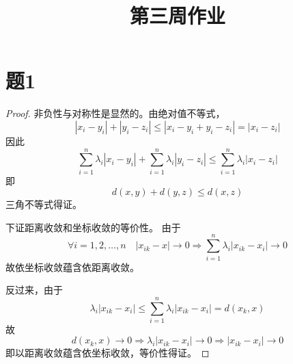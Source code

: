 \documentclass[cn]{homework}
\title{第三周作业}
\begin{document}
    \maketitle

    \section{题1}
    \begin{proof}
        非负性与对称性是显然的。由绝对值不等式，
        \[|x_i-y_i|+|y_i-z_i|\leq|x_i-y_i+y_i-z_i|=|x_i-z_i|\]
        因此
        \[\sum_{i=1}^n\lambda_i|x_i-y_i|
        +\sum_{i=1}^n\lambda_i|y_i-z_i|
        \leq\sum_{i=1}^n\lambda_i|x_i-z_i|\]
        即
        \[d(x,y)+d(y,z)\leq d(x,z)\]
        三角不等式得证。

        下证距离收敛和坐标收敛的等价性。
        由于
        \[\forall i=1,2,\ldots,n\quad |x_{ik}-x|\to 0\Rightarrow
        \sum_{i=1}^n\lambda_i|x_{ik}-x_i|\to 0\]
        故依坐标收敛蕴含依距离收敛。

        反过来，由于
        \[\lambda_i|x_{ik}-x_i|\leq\sum_{i=1}^n\lambda_i|x_{ik}-x_i|
        =d(x_k,x)\]
        故
        \[d(x_k,x)\to 0\Rightarrow \lambda_i|x_{ik}-x_i|\to 0
        \Rightarrow |x_{ik}-x_i|\to 0\]
        即以距离收敛蕴含依坐标收敛，等价性得证。
    \end{proof}    
\end{document}
